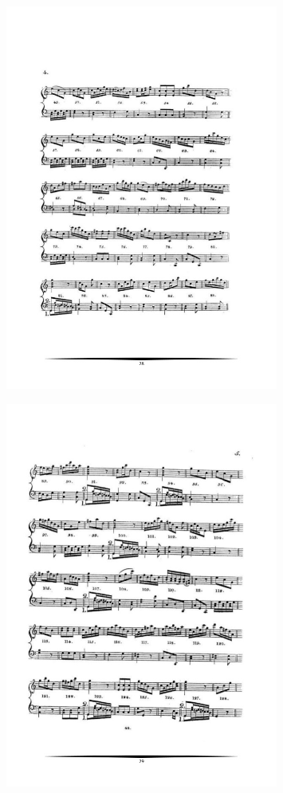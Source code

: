 \documentclass[a4paper, openright, 11pt, titlepage]{report}
\theoremstyle{definition}\newtheorem{defin}[propo]{Definition}
\theoremstyle{definition}\newtheorem{obser}[propo]{Remark}
\theoremstyle{definition}\newtheorem{ejem}[propo]{Ejemplo}
\theoremstyle{definition}\newtheorem{algoritmo}[propo]{Algoritmo}
\begin{document}
\begin{figure}[H]
    \centering
    \includegraphics[width = 0.8\textwidth]{mozart5.png}
\end{figure}
\begin{figure}[H]
    \centering
    \includegraphics[width = 0.8\textwidth]{mozart6.png}
\end{figure}
\end{document}
